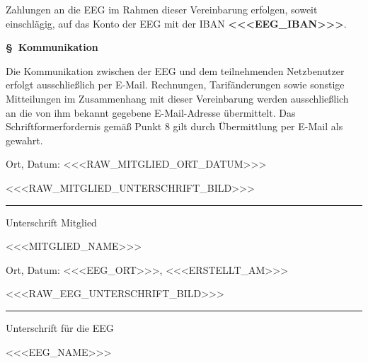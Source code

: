 \documentclass[a4paper,11pt]{article}
\newcounter{parasec}
\newcommand{\parasec}[1]{%
  \stepcounter{parasec}%
  \par\Needspace*{5\baselineskip}%
  \bigskip
  {\large\bfseries\color{tuerkis}\S\ \theparasec\quad #1}\par\nopagebreak
  \smallskip\nopagebreak
}
\begin{document}
Zahlungen an die EEG im Rahmen dieser Vereinbarung erfolgen, soweit einschlägig, auf das Konto der EEG mit der IBAN \textbf{<<<EEG_IBAN>>>}.

\parasec{Kommunikation}

Die Kommunikation zwischen der EEG und dem teilnehmenden Netzbenutzer erfolgt ausschließlich per E-Mail. Rechnungen, Tarifänderungen sowie sonstige Mitteilungen im Zusammenhang mit dieser Vereinbarung werden ausschließlich an die von ihm bekannt gegebene E-Mail-Adresse übermittelt. Das Schriftformerfordernis gemäß Punkt 8 gilt durch Übermittlung per E-Mail als gewahrt.

\par\vspace{1.5\baselineskip}

\noindent
\begin{minipage}[t]{0.48\textwidth}
  Ort, Datum: <<<RAW_MITGLIED_ORT_DATUM>>>
  \par\vspace{3\baselineskip}
  <<<RAW_MITGLIED_UNTERSCHRIFT_BILD>>>\rule{5cm}{0.4pt}\par
  Unterschrift Mitglied\par
  <<<MITGLIED_NAME>>>
\end{minipage}%
\hfill
\begin{minipage}[t]{0.48\textwidth}
  Ort, Datum: <<<EEG_ORT>>>, <<<ERSTELLT_AM>>>
  \par\vspace{3\baselineskip}
  <<<RAW_EEG_UNTERSCHRIFT_BILD>>>\rule{5cm}{0.4pt}\par
  Unterschrift für die EEG\par
  <<<EEG_NAME>>>
\end{minipage}
\end{document}
